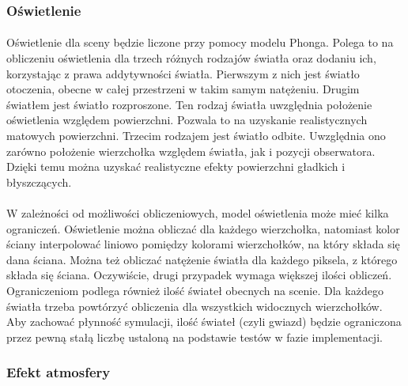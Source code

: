 \subsubsection{Oświetlenie}\label{subsub:oswietlenie}

\paragraph{}

Oświetlenie dla sceny będzie liczone przy pomocy modelu Phonga. Polega to na obliczeniu oświetlenia dla trzech różnych rodzajów światła oraz dodaniu ich, korzystając z prawa addytywności światła. Pierwszym z nich jest światło otoczenia, obecne w całej przestrzeni w takim samym natężeniu. Drugim światłem jest światło rozproszone. Ten rodzaj światła uwzględnia położenie oświetlenia względem powierzchni. Pozwala to na uzyskanie realistycznych matowych powierzchni. Trzecim rodzajem jest światło odbite. Uwzględnia ono zarówno położenie wierzchołka względem światła, jak i pozycji obserwatora. Dzięki temu można uzyskać realistyczne efekty powierzchni gładkich i błyszczących.

\paragraph{}

W zależności od możliwości obliczeniowych, model oświetlenia może mieć kilka ograniczeń. Oświetlenie można obliczać dla każdego wierzchołka, natomiast kolor ściany interpolować liniowo pomiędzy kolorami wierzchołków, na który składa się dana ściana. Można też obliczać natężenie światła dla każdego piksela, z którego składa się ściana. Oczywiście, drugi przypadek wymaga większej ilości obliczeń. Ograniczeniom podlega również ilość świateł obecnych na scenie. Dla każdego światła trzeba powtórzyć obliczenia dla wszystkich widocznych wierzchołków. Aby zachować płynność symulacji, ilość świateł (czyli gwiazd) będzie ograniczona przez pewną stałą liczbę ustaloną na podstawie testów w fazie implementacji.

\subsubsection{Efekt atmosfery}\label{subsub:efekt atmosfery}

\paragraph{}

